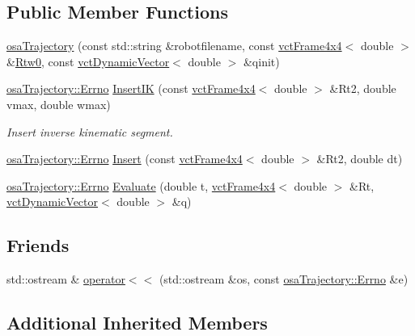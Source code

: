 \subsection*{Public Member Functions}
\begin{DoxyCompactItemize}
\item 
\hyperlink{classosa_trajectory_a1011e0e231922d9130e3e4509aac0cd3}{osa\-Trajectory} (const std\-::string \&robotfilename, const \hyperlink{classvct_frame4x4}{vct\-Frame4x4}$<$ double $>$ \&\hyperlink{classrob_manipulator_ab48d9d9a166bf252698bc35788ca6ad6}{Rtw0}, const \hyperlink{classvct_dynamic_vector}{vct\-Dynamic\-Vector}$<$ double $>$ \&qinit)
\item 
\hyperlink{classosa_trajectory_a9d6482436bb2b9a6c0513e2811ab79fc}{osa\-Trajectory\-::\-Errno} \hyperlink{classosa_trajectory_a91223c5d624edcfece34264e985d77de}{Insert\-I\-K} (const \hyperlink{classvct_frame4x4}{vct\-Frame4x4}$<$ double $>$ \&Rt2, double vmax, double wmax)
\begin{DoxyCompactList}\small\item\em Insert inverse kinematic segment. \end{DoxyCompactList}\item 
\hyperlink{classosa_trajectory_a9d6482436bb2b9a6c0513e2811ab79fc}{osa\-Trajectory\-::\-Errno} \hyperlink{classosa_trajectory_a8b65a6dee146d10af024d26ca9f5a46d}{Insert} (const \hyperlink{classvct_frame4x4}{vct\-Frame4x4}$<$ double $>$ \&Rt2, double dt)
\item 
\hyperlink{classosa_trajectory_a9d6482436bb2b9a6c0513e2811ab79fc}{osa\-Trajectory\-::\-Errno} \hyperlink{classosa_trajectory_a70df95503cc650ccfc671f076989b053}{Evaluate} (double t, \hyperlink{classvct_frame4x4}{vct\-Frame4x4}$<$ double $>$ \&Rt, \hyperlink{classvct_dynamic_vector}{vct\-Dynamic\-Vector}$<$ double $>$ \&q)
\end{DoxyCompactItemize}
\subsection*{Friends}
\begin{DoxyCompactItemize}
\item 
std\-::ostream \& \hyperlink{classosa_trajectory_a6b3f1ffdb01d90f1cc08e5ebc8ef6bdf}{operator$<$$<$} (std\-::ostream \&os, const \hyperlink{classosa_trajectory_a9d6482436bb2b9a6c0513e2811ab79fc}{osa\-Trajectory\-::\-Errno} \&e)
\end{DoxyCompactItemize}
\subsection*{Additional Inherited Members}


